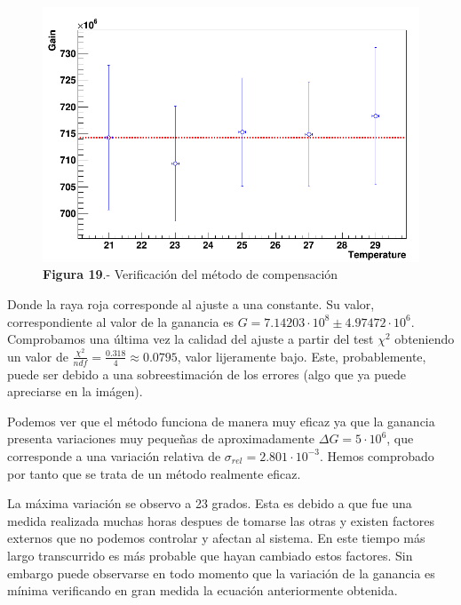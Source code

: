 \begin{figure}[hbtp]
\centering
\includegraphics[scale=0.4]{compensacion.png}
\caption{\textbf{Figura 19}.- Verificación del método de compensación}
\end{figure}

Donde la raya roja corresponde al ajuste a una constante. Su valor, correspondiente al valor de la ganancia es $G=7.14203 \cdot 10^8 \pm 4.97472 \cdot 10^6$. Comprobamos una última vez la calidad del ajuste a partir del test $\chi^2$ obteniendo un valor de $\frac{\chi^2}{ndf}=\frac{0.318}{4}\approx 0.0795$, valor lijeramente bajo. Este, probablemente, puede ser debido a una sobreestimación de los errores (algo que ya puede apreciarse en la imágen).

Podemos ver que el método funciona de manera muy eficaz ya que la ganancia presenta variaciones muy pequeñas de aproximadamente $\Delta G=5 \cdot 10^6$, que corresponde a una variación relativa de $\sigma_{rel}=2.801 \cdot 10^{-3} $. Hemos comprobado por tanto que se trata de un método realmente eficaz.

La máxima variación se observo a 23 grados. Esta es debido a que fue una medida realizada muchas horas despues de tomarse las otras y existen factores externos que no podemos controlar y afectan al sistema. En este tiempo más largo transcurrido es más probable que hayan cambiado estos factores. Sin embargo puede observarse en todo momento que la variación de la ganancia es mínima verificando en gran medida la ecuación anteriormente obtenida.

